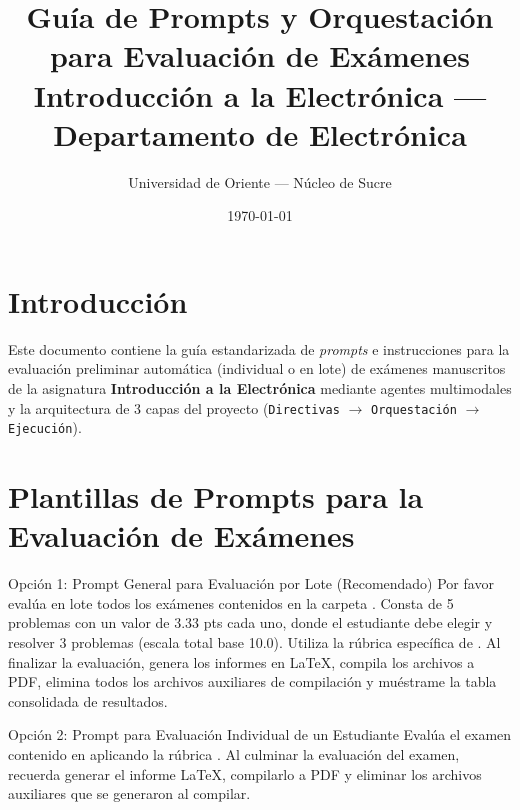 \documentclass[12pt,letterpaper]{article}
\title{\textbf{Guía de Prompts y Orquestación para Evaluación de Exámenes}\\[0.3em]
\large Introducción a la Electrónica --- Departamento de Electrónica}
\author{Universidad de Oriente --- Núcleo de Sucre}
\date{\today}
\begin{document}
\maketitle

\section{Introducción}
Este documento contiene la guía estandarizada de \textit{prompts} e instrucciones para la evaluación preliminar automática (individual o en lote) de exámenes manuscritos de la asignatura \textbf{Introducción a la Electrónica} mediante agentes multimodales y la arquitectura de 3 capas del proyecto (\texttt{Directivas} $\rightarrow$ \texttt{Orquestación} $\rightarrow$ \texttt{Ejecución}).

\section{Plantillas de Prompts para la Evaluación de Exámenes}

\begin{promptbox}{Opción 1: Prompt General para Evaluación por Lote (Recomendado)}
Por favor evalúa en lote todos los exámenes contenidos en la carpeta . Consta de 5 problemas con un valor de 3.33 pts cada uno, donde el estudiante debe elegir y resolver 3 problemas (escala total base 10.0). Utiliza la rúbrica específica de . Al finalizar la evaluación, genera los informes en LaTeX, compila los archivos a PDF, elimina todos los archivos auxiliares de compilación y muéstrame la tabla consolidada de resultados.
\end{promptbox}

\vspace{0.5em}

\begin{promptbox}{Opción 2: Prompt para Evaluación Individual de un Estudiante}
Evalúa el examen contenido en  aplicando la rúbrica . Al culminar la evaluación del examen, recuerda generar el informe LaTeX, compilarlo a PDF y eliminar los archivos auxiliares que se generaron al compilar.
\end{promptbox}

\vspace{0.5em}
\end{document}
